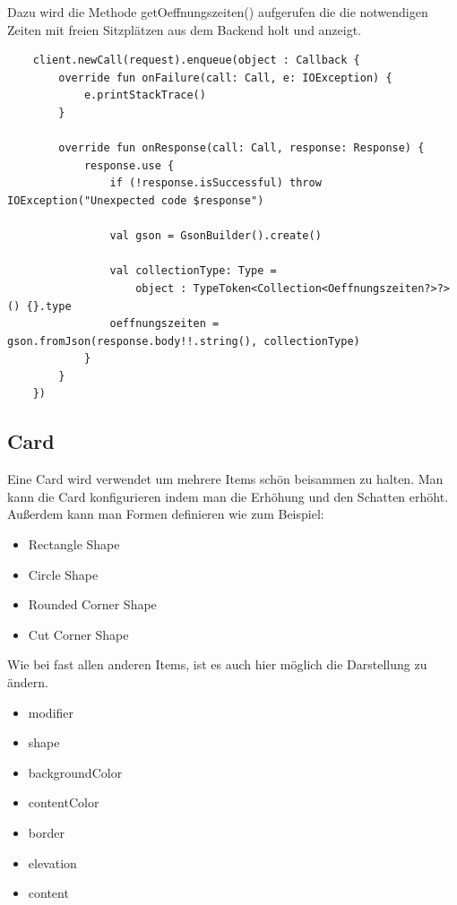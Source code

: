 Dazu wird die Methode getOeffnungszeiten() aufgerufen die die notwendigen Zeiten mit freien Sitzplätzen aus dem Backend holt und anzeigt.


\begin{lstlisting}
    client.newCall(request).enqueue(object : Callback {
        override fun onFailure(call: Call, e: IOException) {
            e.printStackTrace()
        }

        override fun onResponse(call: Call, response: Response) {
            response.use {
                if (!response.isSuccessful) throw IOException("Unexpected code $response")

                val gson = GsonBuilder().create()

                val collectionType: Type =
                    object : TypeToken<Collection<Oeffnungszeiten?>?>() {}.type
                oeffnungszeiten = gson.fromJson(response.body!!.string(), collectionType)
            }
        }
    })
\end{lstlisting}

\subsection{Card}
\cite{Card}
\author{Bozidar Spasenovic}

Eine Card wird verwendet um mehrere Items schön beisammen zu halten. Man kann die Card konfigurieren indem man die Erhöhung und den Schatten erhöht.
Außerdem kann man Formen definieren wie zum Beispiel:

\begin{itemize}
    \item Rectangle Shape
    \item Circle Shape
    \item Rounded Corner Shape
    \item Cut Corner Shape
\end{itemize}

Wie bei fast allen anderen Items, ist es auch hier möglich die Darstellung zu ändern.

\begin{itemize}
   \item modifier
   \item shape
   \item backgroundColor
   \item contentColor
   \item border
   \item elevation
   \item content
\end{itemize}

